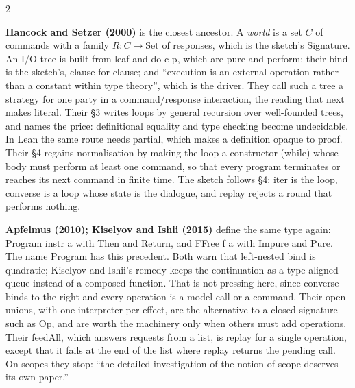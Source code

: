 \documentclass{article}
\newcommand{\topic}[1]{\par\medskip{\bfseries\normalsize #1}\par\smallskip}
\newcommand{\paper}[1]{\par\smallskip\textbf{#1}\quad}
\newcommand{\cd}[1]{{\ttfamily #1}}
\begin{document}
\begin{multicols}{2}
\sffamily\small
\setlength{\parskip}{2pt}

\topic{Programs as trees of operations}

\paper{Hancock and Setzer (2000)} is the closest ancestor. A \emph{world} is a set $C$ of commands
with a family $R : C \to \mathrm{Set}$ of responses, which is the sketch's \cd{Signature}. An
I/O-tree is built from \cd{leaf} and \cd{do c p}, which are \cd{pure} and \cd{perform}; their bind
is the sketch's, clause for clause; and ``execution is an external operation rather than a constant
within type theory'', which is the driver. They call such a tree a strategy for one party in a
command/response interaction, the reading that \cd{next} makes literal. Their \S3 writes
loops by general recursion over well-founded trees, and names the price: definitional equality
and type checking become undecidable. In Lean the same route needs \cd{partial}, which makes a
definition opaque to proof. Their \S4 regains normalisation by making the loop a constructor
(\cd{while}) whose body must perform at least one command, so that every program terminates or
reaches its next command in finite time. The sketch follows \S4: \cd{iter} is the loop,
\cd{converse} is a loop whose state is the dialogue, and \cd{replay} rejects a round that
performs nothing.

\paper{Apfelmus (2010); Kiselyov and Ishii (2015)} define the same type again:
\cd{Program instr a} with \cd{Then} and \cd{Return}, and \cd{FFree f a} with \cd{Impure} and
\cd{Pure}. The name \cd{Program} has this precedent. Both warn that left-nested bind is quadratic;
Kiselyov and Ishii's remedy keeps the continuation as a type-aligned queue instead of a composed
function. That is not pressing here, since \cd{converse} binds to the right and every operation
is a model call or a command. Their open unions, with one interpreter per effect, are the
alternative to a closed signature such as \cd{Op}, and are worth the machinery only when others must add
operations. Their \cd{feedAll}, which answers requests from a list, is \cd{replay} for a single
operation, except that it fails at the end of the list where \cd{replay} returns the pending call.
On scopes they stop: ``the detailed investigation of the notion of scope deserves its own paper.''


\end{multicols}
\end{document}
